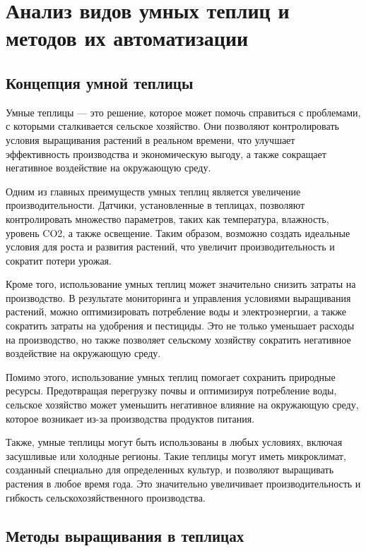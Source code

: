 \chapter{Анализ видов умных теплиц и методов их автоматизации}

\section{Концепция умной теплицы}

Умные теплицы –-- это решение, которое может помочь справиться с проблемами, с которыми сталкивается сельское хозяйство. Они позволяют контролировать условия выращивания растений в реальном времени, что улучшает эффективность производства и экономическую выгоду, а также сокращает негативное воздействие на окружающую среду.

Одним из главных преимуществ умных теплиц является увеличение производительности. Датчики, установленные в теплицах, позволяют контролировать множество параметров, таких как температура, влажность, уровень CO2, а также освещение. Таким образом, возможно создать идеальные условия для роста и развития растений, что увеличит производительность и сократит потери урожая.

Кроме того, использование умных теплиц может значительно снизить затраты на производство. В результате мониторинга и управления условиями выращивания растений, можно оптимизировать потребление воды и электроэнергии, а также сократить затраты на удобрения и пестициды. Это не только уменьшает расходы на производство, но также позволяет сельскому хозяйству сократить негативное воздействие на окружающую среду.

Помимо этого, использование умных теплиц помогает сохранить природные ресурсы. Предотвращая перегрузку почвы и оптимизируя потребление воды, сельское хозяйство может уменьшить негативное влияние на окружающую среду, которое возникает из-за производства продуктов питания.

Также, умные теплицы могут быть использованы в любых условиях, включая засушливые или холодные регионы. Такие теплицы могут иметь микроклимат, созданный специально для определенных культур, и позволяют выращивать растения в любое время года. Это значительно увеличивает производительность и гибкость сельскохозяйственного производства.

\section{Методы выращивания в теплицах}

